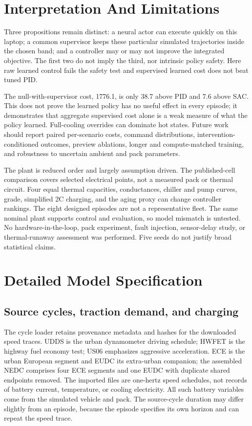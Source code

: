 \documentclass[conference]{IEEEtran}
\begin{document}
\section{Interpretation And Limitations}
Three propositions remain distinct: a neural actor can execute quickly on this laptop; a common supervisor keeps these particular simulated trajectories inside the chosen band; and a controller may or may not improve the integrated objective. The first two do not imply the third, nor intrinsic policy safety. Here raw learned control fails the safety test and supervised learned cost does not beat tuned PID.

The null-with-supervisor cost, 1776.1, is only 38.7 above PID and 7.6 above SAC. This does not prove the learned policy has no useful effect in every episode; it demonstrates that aggregate supervised cost alone is a weak measure of what the policy learned. Full-cooling overrides can dominate hot states. Future work should report paired per-scenario costs, command distributions, intervention-conditioned outcomes, preview ablations, longer and compute-matched training, and robustness to uncertain ambient and pack parameters.

The plant is reduced order and largely assumption driven. The published-cell comparison covers selected electrical points, not a measured pack or thermal circuit. Four equal thermal capacities, conductances, chiller and pump curves, grade, simplified 2C charging, and the aging proxy can change controller rankings. The eight designed episodes are not a representative fleet. The same nominal plant supports control and evaluation, so model mismatch is untested. No hardware-in-the-loop, pack experiment, fault injection, sensor-delay study, or thermal-runaway assessment was performed. Five seeds do not justify broad statistical claims.

\section{Detailed Model Specification}
\subsection{Source cycles, traction demand, and charging}
The cycle loader retains provenance metadata and hashes for the downloaded speed traces. UDDS is the urban dynamometer driving schedule; HWFET is the highway fuel economy test; US06 emphasizes aggressive acceleration. ECE is the urban European segment and EUDC its extra-urban companion; the assembled NEDC comprises four ECE segments and one EUDC with duplicate shared endpoints removed. The imported files are one-hertz speed schedules, not records of battery current, temperature, or cooling electricity. All such battery variables come from the simulated vehicle and pack. The source-cycle duration may differ slightly from an episode, because the episode specifies its own horizon and can repeat the speed trace.
\end{document}

